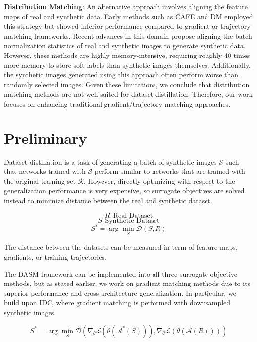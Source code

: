 \documentclass{article}
\theoremstyle{plain}
\theoremstyle{definition}
\theoremstyle{remark}
\begin{document}
\textbf{Distribution Matching}: An alternative approach involves aligning the feature maps of real and synthetic data.
Early methods such as CAFE and DM employed this strategy but showed inferior performance compared to gradient or trajectory matching frameworks.
Recent advances in this domain propose aligning the batch normalization statistics of real and synthetic images to generate synthetic data.
However, these methods are highly memory-intensive, requiring roughly 40 times more memory to store soft labels than synthetic images themselves.
Additionally, the synthetic images generated using this approach often perform worse than randomly selected images.
Given these limitations, we conclude that distribution matching methods are not well-suited for dataset distillation. Therefore, our work focuses on enhancing traditional gradient/trajectory matching approaches.

\section{Preliminary}

Dataset distillation is a task of generating a batch of synthetic images $\mathcal{S}$ such that networks trained with $\mathcal{S}$ perform similar to networks that are trained with the original training set $\mathcal{R}$. However, directly optimizing with respect to the generalization performance is very expensive, so surrogate objectives are solved instead to minimize distance between the real and synthetic dataset.

\begin{equation}
R: \text{Real Dataset}
\end{equation}
\begin{equation}
S: \text{Synthetic Dataset}
\end{equation}
\begin{equation}
S^* = \arg \min_{S} \mathcal{D}(S,R)
\end{equation}

The distance between the datasets can be measured in term of feature maps, gradients, or training trajectories. 

The  DASM framework can be implemented into all three surrogate objective methods, but as stated earlier, we work on gradient matching methods due to its superior performance and cross architecture generalization. In particular, we build upon IDC, where gradient matching is performed with downsampled synthetic images.

\begin{equation}
S^* = \arg \min_{S} \mathcal{D} \left( \nabla_{\theta} \mathcal{L}(\theta(\mathcal{A}^*(S))), \nabla_{\theta} \mathcal{L}(\theta(\mathcal{A}(R))) \right)
\end{equation}
\end{document}

